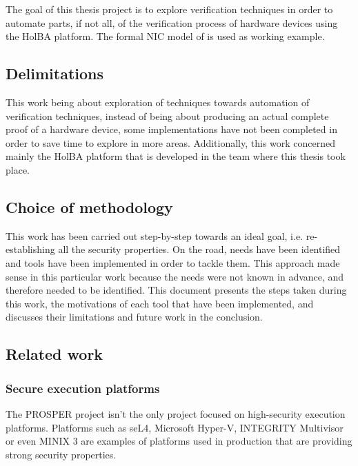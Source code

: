 \documentclass[10pt,a4paper]{article}
\begin{document}
\begin{multicols}{2}
The goal of this thesis project is to explore verification techniques in order to automate parts, if not all, of the verification process of hardware devices using the HolBA platform. The formal {NIC} model of \cite{haglund_formal_2016} is used as working example.

\subsection{Delimitations}

This work being about exploration of techniques towards automation of verification techniques, instead of being about producing an actual complete proof of a hardware device, some implementations have not been completed in order to save time to explore in more areas. Additionally, this work concerned mainly the HolBA platform that is developed in the team where this thesis took place.

\subsection{Choice of methodology}

This work has been carried out step-by-step towards an ideal goal, i.e. re-establishing all the security properties. On the road, needs have been identified and tools have been implemented in order to tackle them. This approach made sense in this particular work because the needs were not known in advance, and therefore needed to be identified. This document presents the steps taken during this work, the motivations of each tool that have been implemented, and discusses their limitations and future work in the conclusion.

\subsection{Related work}

\subsubsection{Secure execution platforms}

The {PROSPER} project isn't the only project focused on high-security execution platforms. Platforms such as seL4, Microsoft Hyper-V, INTEGRITY Multivisor or even MINIX 3 are examples of platforms used in production that are providing strong security properties.


\end{multicols}
\end{document}
